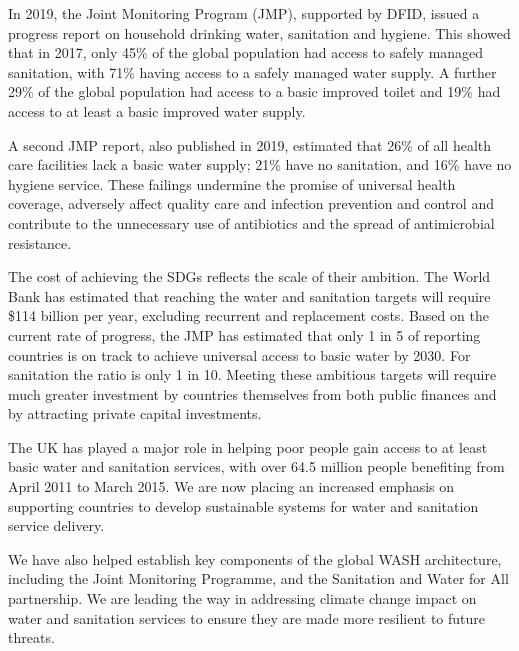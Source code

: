 In 2019, the Joint Monitoring Program (JMP), supported by DFID, issued a progress report on household drinking water, sanitation and hygiene. %
This showed that in 2017, only 45\% of the global population had access to safely managed sanitation, with 71\% having access to a safely managed water supply. %
A further 29\% of the global population had access to a basic improved toilet and 19\% had access to at least a basic improved water supply. %

A second JMP report, also published in 2019, estimated that 26\% of all health care facilities lack a basic water supply; 21\% have no sanitation, and 16\% have no hygiene service. %
These failings undermine the promise of universal health coverage, adversely affect quality care and infection prevention and control and contribute to the unnecessary use of antibiotics and the spread of antimicrobial resistance. %

The cost of achieving the SDGs reflects the scale of their ambition. The World Bank has estimated that reaching the water and sanitation targets will require \$114 billion per year, excluding recurrent and replacement costs. %
Based on the current rate of progress, the JMP has estimated that only 1 in 5 of reporting countries is on track to achieve universal access to basic water by 2030. %
For sanitation the ratio is only 1 in 10. %
Meeting these ambitious targets will require much greater investment by countries themselves from both public finances and by attracting private capital investments. %

The UK has played a major role in helping poor people gain access to at least basic water and sanitation services, with over 64.5 million people benefiting from April 2011 to March 2015. %
We are now placing an increased emphasis on supporting countries to develop sustainable systems for water and sanitation service delivery. %

We have also helped establish key components of the global WASH architecture, including the Joint Monitoring Programme, and the Sanitation and Water for All partnership. %
We are leading the way in addressing climate change impact on water and sanitation services to ensure they are made more resilient to future threats. %

\newpage
